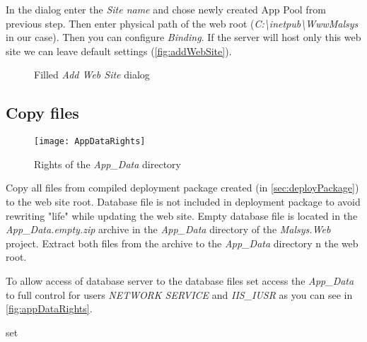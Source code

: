 In the dialog enter the \emph{Site name} and chose newly created App Pool from previous step.
Then enter physical path of the web root (\emph{C:\textbackslash{}inetpub\textbackslash{}WwwMalsys} in our case).
Then you can configure \emph{Binding}.
If the server will host only this web site we can leave default settings (\autoref{fig:addWebSite}).

\begin{figure}[h!]
	\centering
	\caption{Filled \emph{Add Web Site} dialog}	
	\label{fig:addWebSite}
\end{figure}


\subsection{Copy files}

\begin{wrapfigure}{r}{0.5\textwidth}%
	\vspace{-1cm}
	\texttt{[image: AppDataRights]}
	\caption{Rights of the \emph{App\_Data} directory}
	\label{fig:appDataRights}
\end{wrapfigure}

Copy all files from compiled deployment package created (in \autoref{sec:deployPackage}) to the web site root.
Database file is not included in deployment package to avoid rewriting "life" while updating the web site.
Empty database file is located in the \emph{App\_Data.empty.zip} archive in the \emph{App\_Data} directory of the \emph{Malsys.Web} project.
Extract both files from the archive to the \emph{App\_Data} directory n the web root.

To allow access of database server to the database files set access the \emph{App\_Data} to full control  for users \emph{NETWORK SERVICE} and \emph{IIS\_IUSR} as you can see in \autoref{fig:appDataRights}.

	
set 
























